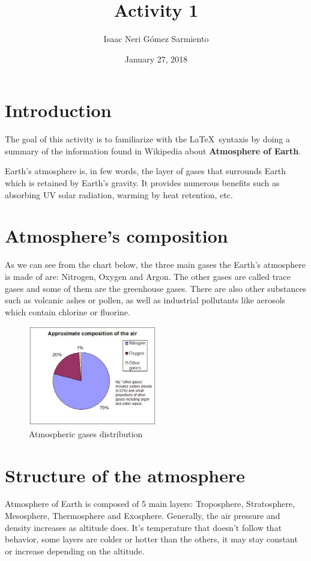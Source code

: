 \documentclass[a4paper]{article}
\title{Activity 1}
\author{Isaac Neri Gómez Sarmiento}
\date {January 27, 2018}
\begin{document}
\maketitle



\section{Introduction}

The goal of this activity is to familiarize with the \LaTeX\ syntaxis by doing a summary of the information found in Wikipedia about {\bf Atmosphere of Earth}. \par 


Earth's atmosphere is, in few words, the layer of gases that surrounds  Earth which is retained by Earth's gravity. It provides numerous benefits such as absorbing UV solar radiation, warming by heat retention, etc. 

\section{Atmosphere's composition}

As we can see from the chart below, the three main gases the Earth's atmosphere is made of are: Nitrogen, Oxygen and Argon. The other gases are called trace gases and some of them are the greenhouse gases. There are also other substances such as volcanic ashes or pollen, as well as industrial pollutants like aerosols which contain chlorine or fluorine.

\begin{figure}[h!]
\centering
\includegraphics[width=0.5\textwidth]{Air_composition_pie_chart}
\caption{\label{fig:Atmosphere Pie Chart}Atmospheric gases distribution}
\end{figure}


\section{Structure of the atmosphere}
Atmosphere of Earth is composed of 5 main layers: Troposphere, Stratosphere, Mesosphere, Thermosphere and Exosphere. Generally, the air pressure and density increases as altitude does. It's temperature that doesn't follow that behavior, some layers are colder or hotter than the others, it may stay constant or increase depending on the altitude. 
\end{document}
